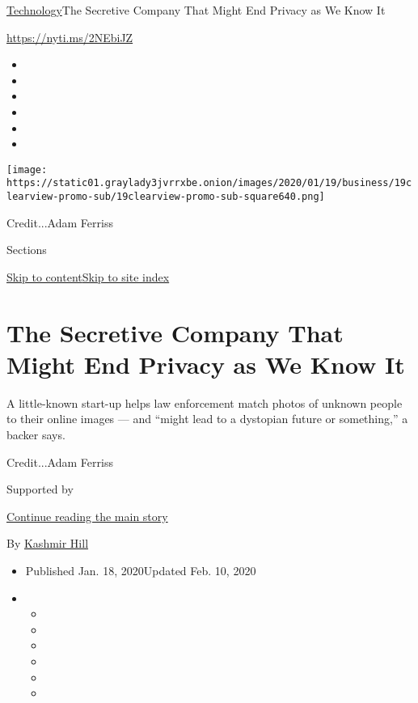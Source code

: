 \href{/section/technology}{Technology}\textbar{}The Secretive Company
That Might End Privacy as We Know It

\href{https://nyti.ms/2NEbiJZ}{https://nyti.ms/2NEbiJZ}

\begin{itemize}
\item
\item
\item
\item
\item
\item
\end{itemize}

\texttt{[image: https://static01.graylady3jvrrxbe.onion/images/2020/01/19/business/19clearview-promo-sub/19clearview-promo-sub-square640.png]}

Credit...Adam Ferriss

Sections

\protect\hyperlink{site-content}{Skip to
content}\protect\hyperlink{site-index}{Skip to site index}

\hypertarget{the-secretive-company-that-might-end-privacy-as-we-know-it}{%
\section{The Secretive Company That Might End Privacy as We Know
It}\label{the-secretive-company-that-might-end-privacy-as-we-know-it}}

A little-known start-up helps law enforcement match photos of unknown
people to their online images --- and ``might lead to a dystopian future
or something,'' a backer says.

Credit...Adam Ferriss

Supported by

\protect\hyperlink{after-sponsor}{Continue reading the main story}

By \href{https://www.nytimes3xbfgragh.onion/by/kashmir-hill}{Kashmir
Hill}

\begin{itemize}
\item
  Published Jan. 18, 2020Updated Feb. 10, 2020
\item
  \begin{itemize}
  \item
  \item
  \item
  \item
  \item
  \item
  \end{itemize}
\end{itemize}


